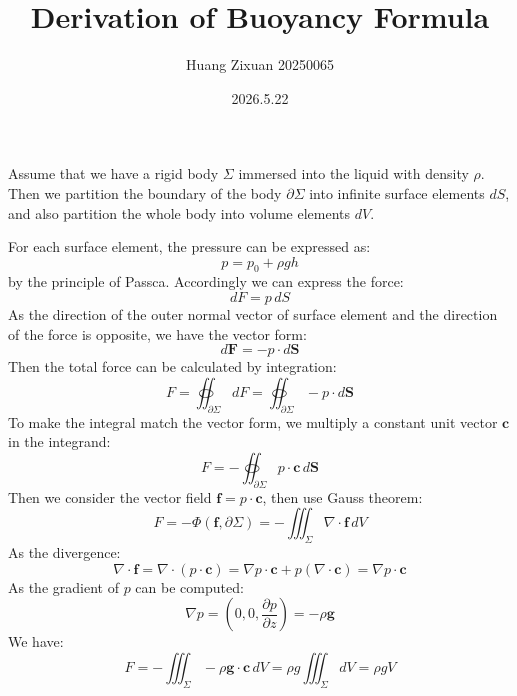 \documentclass{article}
\begin{document}
  \title{Derivation of Buoyancy Formula}
  \author{Huang Zixuan 20250065}
  \date{2026.5.22}

  \maketitle

  \par Assume that we have a rigid body $\Sigma$ immersed into the liquid with density $\rho$. Then we partition the boundary of the body $\partial \Sigma$ into infinite surface elements $dS$,
  and also partition the whole body into volume elements $dV$.
  \par For each surface element, the pressure can be expressed as:
  $$p=p_0+\rho gh$$
  by the principle of Passca.
  Accordingly we can express the force:
  $$dF=p\,dS$$
  As the direction of the outer normal vector of surface element and the direction of the force is opposite, we have the vector form:
  $$d\mathbf{F}=-p\cdot d\mathbf{S}$$
  Then the total force can be calculated by integration:
  $$F=\oiint_{\partial \Sigma}dF=\oiint_{\partial \Sigma}-p\cdot d\mathbf{S}$$
  To make the integral match the vector form, we multiply a constant unit vector $\mathbf{c}$ in the integrand:
  $$F=-\oiint_{\partial \Sigma}p\cdot \mathbf{c}\,d\mathbf{S}$$
  Then we consider the vector field $\mathbf{f}=p\cdot \mathbf{c}$, then use Gauss theorem:
  $$F=-\Phi(\mathbf{f},\partial \Sigma)=-\iiint_{\Sigma}\nabla \cdot \mathbf{f}\,dV$$
  As the divergence:
  $$\nabla \cdot \mathbf{f}=\nabla \cdot (p\cdot\mathbf{c})=\nabla p\cdot \mathbf{c}+p(\nabla \cdot \mathbf{c})=\nabla p\cdot \mathbf{c}$$
  As the gradient of $p$ can be computed:
  $$\nabla p=(0,0,\frac{\partial p}{\partial z})=-\rho \mathbf{g}$$
  We have:
  $$F=-\iiint_{\Sigma}-\rho \mathbf{g}\cdot \mathbf{c}\,dV=\rho g\iiint_{\Sigma}dV=\rho gV$$ 
\end{document}
